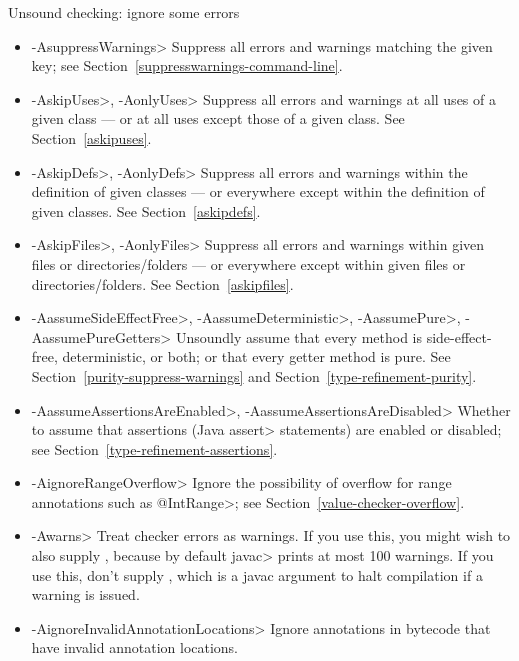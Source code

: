 Unsound checking: ignore some errors
\begin{itemize}
\item \<-AsuppressWarnings>
  Suppress all errors and warnings matching the given key; see
  Section~\ref{suppresswarnings-command-line}.
\item \<-AskipUses>, \<-AonlyUses>
  Suppress all errors and warnings at all uses of a given class --- or at all
  uses except those of a given class.  See Section~\ref{askipuses}.
\item \<-AskipDefs>, \<-AonlyDefs>
  Suppress all errors and warnings within the definition of given classes
  --- or everywhere except within the definition of given classes.  See
  Section~\ref{askipdefs}.
\item \<-AskipFiles>, \<-AonlyFiles>
  Suppress all errors and warnings within given files or directories/folders
  --- or everywhere except within given files or directories/folders.  See
  Section~\ref{askipfiles}.
\item \<-AassumeSideEffectFree>, \<-AassumeDeterministic>, \<-AassumePure>, \<-AassumePureGetters>
  Unsoundly assume that every method is side-effect-free, deterministic, or
  both; or that every getter method is pure.
  See Section~\ref{purity-suppress-warnings} and
  Section~\ref{type-refinement-purity}.
\item \<-AassumeAssertionsAreEnabled>, \<-AassumeAssertionsAreDisabled>
  Whether to assume that assertions (Java \<assert> statements) are enabled
  or disabled; see Section~\ref{type-refinement-assertions}.
\item \<-AignoreRangeOverflow>
  Ignore the possibility of overflow for range annotations such as
  \<@IntRange>; see Section~\ref{value-checker-overflow}.
\item \<-Awarns>
  Treat checker errors as warnings.  If you use this, you might wish to also
  supply , because by default \<javac> prints at
  most 100 warnings.  If you use this, don't supply ,
  which is a javac argument to halt compilation if a warning is issued.
\item \<-AignoreInvalidAnnotationLocations>
  Ignore annotations in bytecode that have invalid annotation locations.
\end{itemize}

